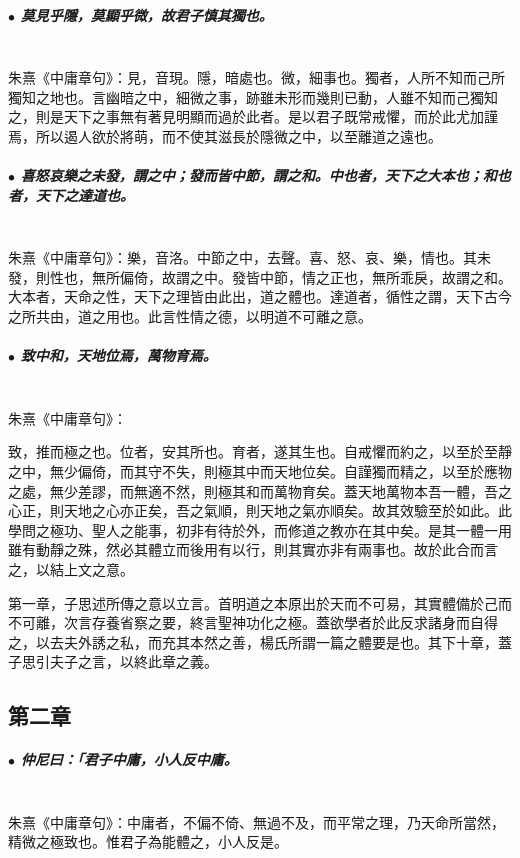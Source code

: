 \documentclass[hyperref, UTF8, 12pt, a4paper]{ctexrep}
\begin{document}
\subparagraph{$\bullet$ 莫見乎隱，莫顯乎微，故君子慎其獨也。} ~\\

朱熹《中庸章句》：見，音現。隱，暗處也。微，細事也。獨者，人所不知而己所獨知之地也。言幽暗之中，細微之事，跡雖未形而幾則已動，人雖不知而己獨知之，則是天下之事無有著見明顯而過於此者。是以君子既常戒懼，而於此尤加謹焉，所以遏人欲於將萌，而不使其滋長於隱微之中，以至離道之遠也。

\subparagraph{$\bullet$ 喜怒哀樂之未發，謂之中；發而皆中節，謂之和。中也者，天下之大本也；和也者，天下之達道也。} ~\\

朱熹《中庸章句》：樂，音洛。中節之中，去聲。喜、怒、哀、樂，情也。其未發，則性也，無所偏倚，故謂之中。發皆中節，情之正也，無所乖戾，故謂之和。大本者，天命之性，天下之理皆由此出，道之體也。達道者，循性之謂，天下古今之所共由，道之用也。此言性情之德，以明道不可離之意。

\subparagraph{$\bullet$ 致中和，天地位焉，萬物育焉。} ~\\

朱熹《中庸章句》：

\begin{adjustwidth}{2cm}{1cm}
\indent\indent 致，推而極之也。位者，安其所也。育者，遂其生也。自戒懼而約之，以至於至靜之中，無少偏倚，而其守不失，則極其中而天地位矣。自謹獨而精之，以至於應物之處，無少差謬，而無適不然，則極其和而萬物育矣。蓋天地萬物本吾一體，吾之心正，則天地之心亦正矣，吾之氣順，則天地之氣亦順矣。故其效驗至於如此。此學問之極功、聖人之能事，初非有待於外，而修道之教亦在其中矣。是其一體一用雖有動靜之殊，然必其體立而後用有以行，則其實亦非有兩事也。故於此合而言之，以結上文之意。

第一章，子思述所傳之意以立言。首明道之本原出於天而不可易，其實體備於己而不可離，次言存養省察之要，終言聖神功化之極。蓋欲學者於此反求諸身而自得之，以去夫外誘之私，而充其本然之善，楊氏所謂一篇之體要是也。其下十章，蓋子思引夫子之言，以終此章之義。
\end{adjustwidth}

\newpage
\subsection{第二章}

\subparagraph{$\bullet$ 仲尼曰：「君子中庸，小人反中庸。} ~\\

朱熹《中庸章句》：中庸者，不偏不倚、無過不及，而平常之理，乃天命所當然，精微之極致也。惟君子為能體之，小人反是。
\end{document}
